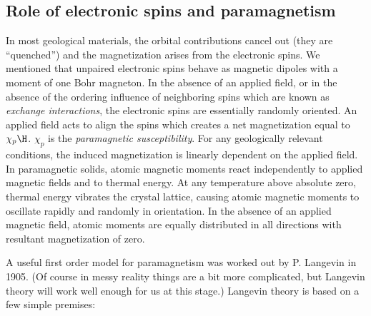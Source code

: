 \subsection {Role of electronic spins and paramagnetism}
\label{sect:para}

In most geological materials, the orbital contributions cancel out (they are ``quenched'') and the magnetization arises from the electronic spins.    We mentioned that unpaired electronic spins  behave as magnetic dipoles with a moment of one 
Bohr magneton. 
In the absence of an applied field, or in  the absence of the  
ordering influence of neighboring
spins which are known as 
%
{\it exchange interactions}, the electronic spins are essentially randomly oriented. 
An applied field acts to align the
spins which creates a net magnetization equal to $\chi_p \H$.  
%
$\chi_p$ is the {\it paramagnetic susceptibility}.  For
any geologically relevant conditions, the induced magnetization is linearly dependent on the applied field. In paramagnetic solids, atomic magnetic moments react independently to applied magnetic fields and to
thermal energy. At any temperature above absolute zero, thermal energy vibrates the crystal lattice, causing
atomic magnetic moments to oscillate rapidly and randomly in orientation. In the absence of an applied
magnetic field, atomic moments are equally distributed in all directions with resultant magnetization of zero.


A useful first order model for  paramagnetism was worked out by 
P. Langevin in 1905.   (Of course in messy reality things are a bit more complicated, but Langevin theory will work well enough for us at this stage.)
Langevin theory is based on a few simple
premises:



